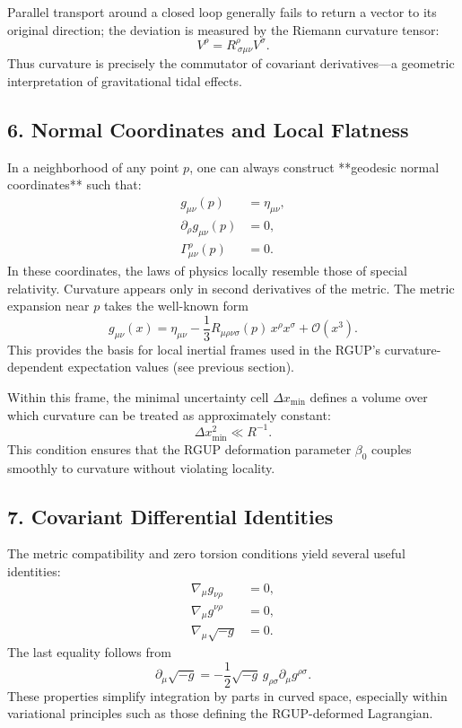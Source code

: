 \documentclass[11pt,oneside]{book}
\numberwithin{equation}{chapter}
\newcommand{\betaz}{\beta_0}
\begin{document}
Parallel transport around a closed loop generally fails to return a vector to its original direction; the deviation is measured by the Riemann curvature tensor:
\begin{equation}
[\nabla_\mu,\nabla_\nu]V^\rho = R^\rho_{\ \sigma\mu\nu}V^\sigma.
\end{equation}
Thus curvature is precisely the commutator of covariant derivatives—a geometric interpretation of gravitational tidal effects.

\subsection*{6. Normal Coordinates and Local Flatness}

In a neighborhood of any point $p$, one can always construct **geodesic normal coordinates** such that:
\begin{align*}
g_{\mu\nu}(p) &= \eta_{\mu\nu}, \\
\partial_\rho g_{\mu\nu}(p) &= 0, \\
\Gamma^\rho_{\mu\nu}(p) &= 0.
\end{align*}
In these coordinates, the laws of physics locally resemble those of special relativity.  
Curvature appears only in second derivatives of the metric.  
The metric expansion near $p$ takes the well-known form
\begin{equation}
g_{\mu\nu}(x)
= \eta_{\mu\nu}
- \frac{1}{3} R_{\mu\rho\nu\sigma}(p)\,x^\rho x^\sigma
+ \mathcal{O}(x^3).
\end{equation}
This provides the basis for local inertial frames used in the RGUP’s curvature-dependent expectation values (see previous section).  

Within this frame, the minimal uncertainty cell $\Delta x_{\min}$ defines a volume over which curvature can be treated as approximately constant:
\begin{equation}
\Delta x_{\min}^2 \ll R^{-1}.
\end{equation}
This condition ensures that the RGUP deformation parameter $\betaz$ couples smoothly to curvature without violating locality.

\subsection*{7. Covariant Differential Identities}

The metric compatibility and zero torsion conditions yield several useful identities:
\begin{align}
\nabla_\mu g_{\nu\rho} &= 0, \\
\nabla_\mu g^{\nu\rho} &= 0, \\
\nabla_\mu \sqrt{-g} &= 0.
\end{align}
The last equality follows from
\begin{equation}
\partial_\mu \sqrt{-g} = -\frac{1}{2}\sqrt{-g}\,g_{\rho\sigma}\partial_\mu g^{\rho\sigma}.
\end{equation}
These properties simplify integration by parts in curved space, especially within variational principles such as those defining the RGUP-deformed Lagrangian.
\end{document}
